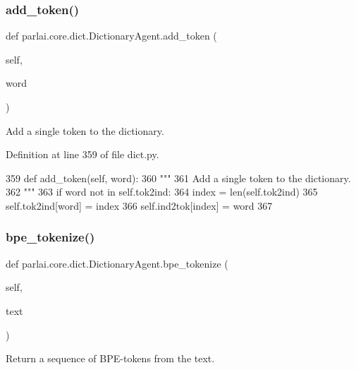\subsubsection{\texorpdfstring{add\+\_\+token()}{add\_token()}}
{\footnotesize\ttfamily def parlai.\+core.\+dict.\+Dictionary\+Agent.\+add\+\_\+token (\begin{DoxyParamCaption}\item[{}]{self,  }\item[{}]{word }\end{DoxyParamCaption})}

\begin{DoxyVerb}Add a single token to the dictionary.
\end{DoxyVerb}
 

Definition at line 359 of file dict.\+py.


\begin{DoxyCode}
359     \textcolor{keyword}{def }add\_token(self, word):
360         \textcolor{stringliteral}{"""}
361 \textcolor{stringliteral}{        Add a single token to the dictionary.}
362 \textcolor{stringliteral}{        """}
363         \textcolor{keywordflow}{if} word \textcolor{keywordflow}{not} \textcolor{keywordflow}{in} self.tok2ind:
364             index = len(self.tok2ind)
365             self.tok2ind[word] = index
366             self.ind2tok[index] = word
367 
\end{DoxyCode}
\mbox{\label{classparlai_1_1core_1_1dict_1_1DictionaryAgent_a520e4bc630cd60f075ad21632ef677a1}} 
\subsubsection{\texorpdfstring{bpe\+\_\+tokenize()}{bpe\_tokenize()}}
{\footnotesize\ttfamily def parlai.\+core.\+dict.\+Dictionary\+Agent.\+bpe\+\_\+tokenize (\begin{DoxyParamCaption}\item[{}]{self,  }\item[{}]{text }\end{DoxyParamCaption})}

\begin{DoxyVerb}Return a sequence of BPE-tokens from the text.
\end{DoxyVerb}
 

